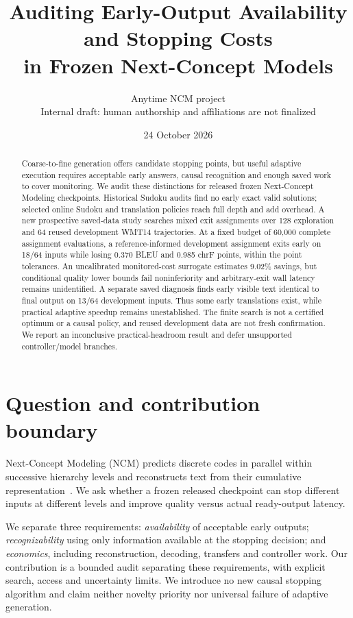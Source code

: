 \documentclass[11pt]{article}
\title{Auditing Early-Output Availability and Stopping Costs\\in Frozen Next-Concept Models}
\author{Anytime NCM project\\{\small Internal draft: human authorship and affiliations are not finalized}}
\date{24 October 2026}
\begin{document}
\maketitle
\begin{abstract}
Coarse-to-fine generation offers candidate stopping points, but useful adaptive execution requires acceptable early answers, causal recognition and enough saved work to cover monitoring. We audit these distinctions for released frozen Next-Concept Modeling checkpoints. Historical Sudoku audits find no early exact valid solutions; selected online Sudoku and translation policies reach full depth and add overhead. A new prospective saved-data study searches mixed exit assignments over 128 exploration and 64 reused development WMT14 trajectories. At a fixed budget of 60,000 complete assignment evaluations, a reference-informed development assignment exits early on 18/64 inputs while losing 0.370 BLEU and 0.985 chrF points, within the point tolerances. An uncalibrated monitored-cost surrogate estimates 9.02\% savings, but conditional quality lower bounds fail noninferiority and arbitrary-exit wall latency remains unidentified. A separate saved diagnosis finds early visible text identical to final output on 13/64 development inputs. Thus some early translations exist, while practical adaptive speedup remains unestablished. The finite search is not a certified optimum or a causal policy, and reused development data are not fresh confirmation. We report an inconclusive practical-headroom result and defer unsupported controller/model branches.
\end{abstract}

\section{Question and contribution boundary}
Next-Concept Modeling (NCM) predicts discrete codes in parallel within successive hierarchy levels and reconstructs text from their cumulative representation~\cite{ncm}. We ask whether a frozen released checkpoint can stop different inputs at different levels and improve quality versus actual ready-output latency.

We separate three requirements: \emph{availability} of acceptable early outputs; \emph{recognizability} using only information available at the stopping decision; and \emph{economics}, including reconstruction, decoding, transfers and controller work. Our contribution is a bounded audit separating these requirements, with explicit search, access and uncertainty limits. We introduce no new causal stopping algorithm and claim neither novelty priority nor universal failure of adaptive generation.
\end{document}

